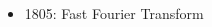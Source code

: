 \begin{frame}
\begin{columns}
\begin{column}{.7\textwidth}
\begin{itemize}[<+->]
        \item 1805: Fast Fourier Transform



        
   
        
         
     
      \end{itemize}
    \end{column}
  \end{columns}
\end{frame}

